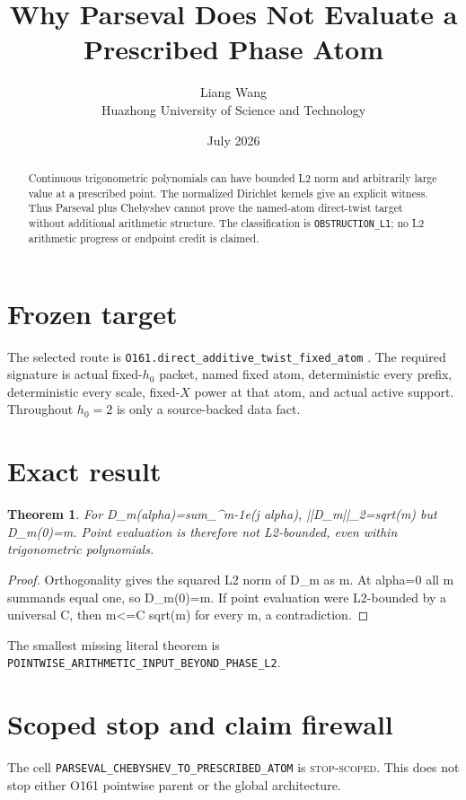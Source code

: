 \documentclass[11pt]{article}
\title{\textbf{Why Parseval Does Not Evaluate a Prescribed Phase Atom}}
\author{Liang Wang\\Huazhong University of Science and Technology}
\date{July 2026}
\newtheorem{theorem}{Theorem}
\begin{document}
\maketitle
\begin{abstract}
Continuous trigonometric polynomials can have bounded L2 norm and arbitrarily large value at a prescribed point.  The normalized Dirichlet kernels give an explicit witness.  Thus Parseval plus Chebyshev cannot prove the named-atom direct-twist target without additional arithmetic structure.
The classification is \texttt{OBSTRUCTION\_\allowbreak{}L1}; no L2 arithmetic
progress or endpoint credit is claimed.
\end{abstract}

\section{Frozen target}
The selected route is \texttt{O161.direct\_\allowbreak{}additive\_\allowbreak{}twist\_\allowbreak{}fixed\_\allowbreak{}atom} \citep{TPC182}.  The required
signature is actual fixed-$h_0$ packet, named fixed atom, deterministic every
prefix, deterministic every scale, fixed-$X$ power at that atom, and actual
active support.  Throughout $h_0=2$ is only a source-backed data fact.

\section{Exact result}
\begin{theorem}
For D\_\allowbreak{}m(alpha)=sum\_\^{}{m-1}e(j alpha), ||D\_\allowbreak{}m||\_\allowbreak{}2=sqrt(m) but D\_\allowbreak{}m(0)=m.  Point evaluation is therefore not L2-bounded, even within trigonometric polynomials.
\end{theorem}
\begin{proof}
Orthogonality gives the squared L2 norm of D\_\allowbreak{}m as m.  At alpha=0 all m summands equal one, so D\_\allowbreak{}m(0)=m.  If point evaluation were L2-bounded by a universal C, then m<=C sqrt(m) for every m, a contradiction.
\end{proof}

The smallest missing literal theorem is
\texttt{POINTWISE\_\allowbreak{}ARITHMETIC\_\allowbreak{}INPUT\_\allowbreak{}BEYOND\_\allowbreak{}PHASE\_\allowbreak{}L2}.

\section{Scoped stop and claim firewall}
The cell \texttt{PARSEVAL\_\allowbreak{}CHEBYSHEV\_\allowbreak{}TO\_\allowbreak{}PRESCRIBED\_\allowbreak{}ATOM} is \textsc{stop-scoped}. This does not stop either O161 pointwise parent or the global architecture.
\end{document}
